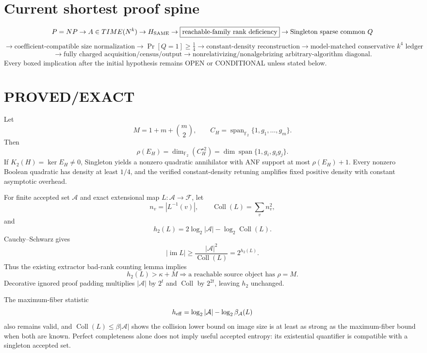 \documentclass[11pt]{article}
\begin{document}
\section*{Current shortest proof spine}
\[
P=NP\to A\in TIME(N^k)\to H_{\rm SAME}
\to \boxed{\text{reachable-family rank deficiency}}
\to \text{Singleton sparse common }Q
\]
\[
\to \boxed{\text{coefficient-compatible size normalization}}
\to \Pr[Q=1]\ge\tfrac14
\to \text{constant-density reconstruction}
\to \boxed{\text{model-matched conservative }k^4\text{ ledger}}
\]
\[
\to \boxed{\text{fully charged acquisition/census/output}}
\to \boxed{\text{nonrelativizing/nonalgebrizing arbitrary-algorithm diagonal}}.
\]
Every boxed implication after the initial hypothesis remains OPEN or CONDITIONAL unless stated below.

\section*{PROVED/EXACT}
Let
\[
M=1+m+\binom m2,\qquad C_H=\operatorname{span}_{\mathbb F_2}\{1,g_1,\ldots,g_m\}.
\]
Then
\[
\rho(E_H)=\dim_{\mathbb F_2}(C_H^{\star2})
=\dim\operatorname{span}\{1,g_i,g_i g_j\}.
\]
If \(K_2(H)=\ker E_H\ne0\), Singleton yields a nonzero quadratic annihilator with ANF support at most \(\rho(E_H)+1\). Every nonzero Boolean quadratic has density at least \(1/4\), and the verified constant-density retuning amplifies fixed positive density with constant asymptotic overhead.

For finite accepted set \(\mathcal A\) and exact extensional map \(L:\mathcal A\to\mathcal F\), let
\[
n_v=|L^{-1}(v)|,\qquad \operatorname{Coll}(L)=\sum_v n_v^2,
\]
and
\[
h_2(L)=2\log_2|\mathcal A|-\log_2\operatorname{Coll}(L).
\]
Cauchy--Schwarz gives
\[
\boxed{|\operatorname{im}L|\ge \frac{|\mathcal A|^2}{\operatorname{Coll}(L)}=2^{h_2(L)}}.
\]
Thus the existing extractor bad-rank counting lemma implies
\[
\boxed{h_2(L)>\kappa+M}\Longrightarrow
\text{a reachable source object has }\rho=M.
\]
Decorative ignored proof padding multiplies \(|\mathcal A|\) by \(2^t\) and \(\operatorname{Coll}\) by \(2^{2t}\), leaving \(h_2\) unchanged.

The maximum-fiber statistic
\[
h_{\rm eff}=\log_2|\mathcal A|-\log_2\beta_{\mathcal A}(L)
\]
also remains valid, and \(\operatorname{Coll}(L)\le\beta|\mathcal A|\) shows the collision lower bound on image size is at least as strong as the maximum-fiber bound when both are known. Perfect completeness alone does not imply useful accepted entropy: its existential quantifier is compatible with a singleton accepted set.
\end{document}
